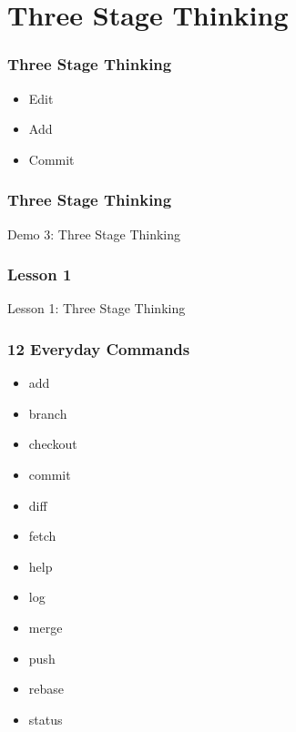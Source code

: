 \section[Section]{Three Stage Thinking}

\begin{frame}
    \frametitle{Three Stage Thinking}
    \begin{itemize}
        \setlength\itemsep{3em}
        \item Edit
        \item Add
        \item Commit
    \end{itemize}
\end{frame}

\begin{frame}
    \frametitle{Three Stage Thinking}
    \alert{Demo 3}: Three Stage Thinking
\end{frame}

\begin{frame}
    \frametitle{Lesson 1}
    \alert{Lesson 1}: Three Stage Thinking
\end{frame}

\begin{frame}
    \frametitle{12 Everyday Commands}
    \begin{multicols}{3}
        \begin{itemize}
            \setlength\itemsep{3em}
            \item \alert{add}
            \item branch
            \item checkout
            \item \alert{commit}
            \item \alert{diff}
            \item fetch
            \item \alert{help}
            \item \alert{log}
            \item merge
            \item push
            \item rebase
            \item \alert{status}
        \end{itemize}
    \end{multicols}
\end{frame}
